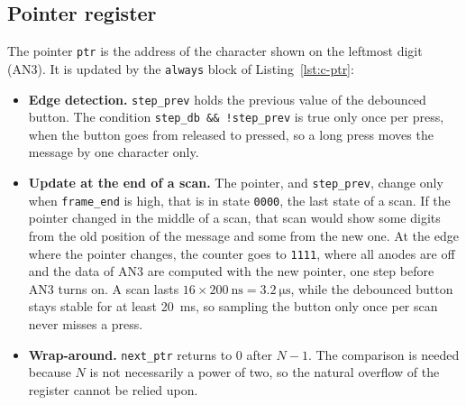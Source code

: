\documentclass{article}
\begin{document}
\subsection{Pointer register}
The pointer \texttt{ptr} is the address of the character shown on the leftmost
digit (AN3). It is updated by the \texttt{always} block of Listing~\ref{lst:c-ptr}:
\begin{itemize}
  \item \textbf{Edge detection.} \texttt{step\_prev} holds the previous value of the
        debounced button. The condition \texttt{step\_db \&\& !step\_prev} is true
        only once per press, when the button goes from released to pressed, so a
        long press moves the message by one character only.
  \item \textbf{Update at the end of a scan.} The pointer, and \texttt{step\_prev},
        change only when \texttt{frame\_end} is high, that is in state \texttt{0000},
        the last state of a scan. If the pointer changed in the middle of a scan,
        that scan would show some digits from the old position of the message and
        some from the new one. At the edge where the pointer changes, the counter
        goes to \texttt{1111}, where all anodes are off and the data of AN3 are
        computed with the new pointer, one step before AN3 turns on. A scan lasts
        $16 \times \SI{200}{\nano\second} = \SI{3.2}{\micro\second}$, while the
        debounced button stays stable for at least \SI{20}{\milli\second}, so
        sampling the button only once per scan never misses a press.
  \item \textbf{Wrap-around.} \texttt{next\_ptr} returns to 0 after $N-1$. The
        comparison is needed because $N$ is not necessarily a power of two, so the
        natural overflow of the register cannot be relied upon.
\end{itemize}


\end{document}
